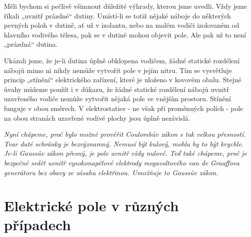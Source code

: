       Měli bychom si pečlivě všimnout důležité výhrady, kterou jsme uvedli. Vždy jsme říkali „uvnitř prázdné“ 
      dutiny. Umístí-li se totiž nějaké náboje do některých pevných poloh v dutině, ať už v izolantu, nebo na 
      malém vodiči izolovaném od hlavního vodivého tělesa, pak se v dutině mohou objevit pole. Ale pak už to 
      není „prázdná“ dutina.
      
      Ukázali jsme, že je-li dutina úplně obklopena vodičem, žádné statické rozdělení nábojů mimo ni nikdy 
      nemůže vytvořit pole v jejím nitru. Tím se vysvětluje princip „stínění“ elektrického zařízení, které 
      je uloženo v kovovém obalu. Stejné úvahy můžeme použít i v důkazu, že žádné statické rozdělení nábojů 
      uvnitř uzavřeného vodiče nemůže vytvořit nějaká pole ve vnějším prostoru. Stínění funguje v obou 
      směrech. V elektrostatice - ne však při proměnných polích - pole na obou stranách uzavřené vodivé 
      plochy jsou úplně nezávislá.
      
      \emph{Nyní chápeme, proč bylo možné prověřit Coulombův zákon s tak velkou přesností. Tvar duté schránky 
      je bezvýznamný. Nemusí být kulový, mohla by to být krychle. Je-li Gaussův zákon přesný, je pole uvnitř 
      vždy nulové. Teď také chápeme, proč je bezpečné sedět uvnitř vysokonapěťové elektrody megavoltového van 
      de Graaffova generátoru bez obavy ze zásahu elektřinou. Umožňuje to Gaussův zákon.}

  \section{Elektrické pole v různých případech} 
  
\printbibliography[heading=subbibliography]